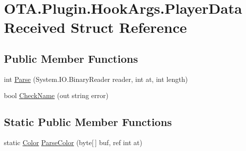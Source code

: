\hypertarget{struct_o_t_a_1_1_plugin_1_1_hook_args_1_1_player_data_received}{}\section{O\+T\+A.\+Plugin.\+Hook\+Args.\+Player\+Data\+Received Struct Reference}
\label{struct_o_t_a_1_1_plugin_1_1_hook_args_1_1_player_data_received}
\subsection*{Public Member Functions}
\begin{DoxyCompactItemize}
\item 
int \hyperlink{struct_o_t_a_1_1_plugin_1_1_hook_args_1_1_player_data_received_a06d589caa90864ab2e03fab5f462ad20}{Parse} (System.\+I\+O.\+Binary\+Reader reader, int at, int length)
\item 
bool \hyperlink{struct_o_t_a_1_1_plugin_1_1_hook_args_1_1_player_data_received_a14767a92284291ed1564bf09ae56a6a8}{Check\+Name} (out string error)
\end{DoxyCompactItemize}
\subsection*{Static Public Member Functions}
\begin{DoxyCompactItemize}
\item 
static \hyperlink{struct_microsoft_1_1_xna_1_1_framework_1_1_color}{Color} \hyperlink{struct_o_t_a_1_1_plugin_1_1_hook_args_1_1_player_data_received_a04e507fb14d716645b0709ead8223b4c}{Parse\+Color} (byte\mbox{[}$\,$\mbox{]} buf, ref int at)
\end{DoxyCompactItemize}
